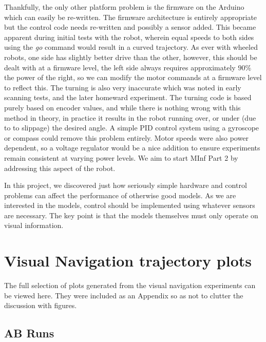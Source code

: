 \documentclass[a4paper,11pt,twoside,openright]{article}
\let\oldsection\section
\def\section{\cleardoublepage\oldsection}
\begin{document}
Thankfully, the only other platform problem is the firmware on the Arduino
which can easily be re-written. The firmware architecture is entirely appropriate but the control code
needs re-written and possibly a sensor added. This became apparent during initial tests with the robot, wherein
equal speeds to both sides using the \textit{go} command would result in a curved trajectory. As ever with
wheeled robots, one side has slightly better drive than the other, however, this should be dealt with at a
firmware level, the left side always requires approximately $90\%$ the power of the right, so we can
modify the motor commands at a firmware level to reflect this. The turning is also very inaccurate which
was noted in early scanning tests, and the later homeward experiment. The turning code is based purely based on
encoder values, and while there is nothing wrong with this method in theory, in practice it results in the robot
running over, or under (due to to slippage) the desired angle. A simple PID control system using a gyroscope
or compass could remove this problem entirely. Motor speeds were also power dependent, so a voltage regulator
would be a nice addition to ensure experiments remain consistent at varying power levels. We aim to start
MInf Part 2 by addressing this aspect of the robot.
\newline

In this project, we discovered just how seriously simple hardware and 
control problems can affect the performance of otherwise good models. As we are interested in the models,
control should be implemented using whatever sensors are necessary. The key point is that the models themselves
must only operate on visual information. 
\newpage



\newpage

\appendix
\section{Visual Navigation trajectory plots} \label{app:plots}

The full selection of plots generated from the visual navigation experiments can be viewed here. They were included
as an Appendix so as not to clutter the discussion with figures.

\subsection{AB Runs}
\end{document}
